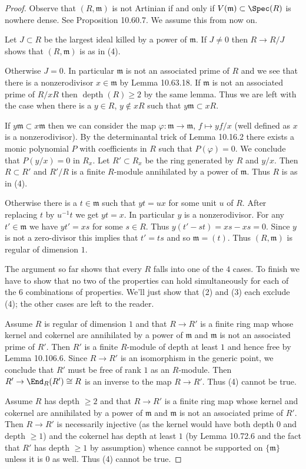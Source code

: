 \begin{proof}
Observe that $(R,\mathfrak m)$ is not Artinian if and only if $V(\mathfrak m)\subset\Spec(R)$ is nowhere dense. See Proposition 10.60.7. We assume this from now on.

Let $J\subset R$ be the largest ideal killed by a power of $\mathfrak m$. If $J\ne0$ then $R\to R/J$ shows that $(R,\mathfrak m)$ is as in (4).

Otherwise $J=0$. In particular $\mathfrak m$ is not an associated prime of $R$ and we see that there is a nonzerodivisor $x\in\mathfrak m$ by Lemma 10.63.18. If $\mathfrak m$ is not an associated prime of $R/xR$ then $\operatorname{depth}(R)\geq2$ by the same lemma. Thus we are left with the case when there is a $y\in R$, $y\notin xR$ such that $y\mathfrak m\subset xR$.

If $y\mathfrak m\subset x\mathfrak m$ then we can consider the map $\varphi:\mathfrak m\to\mathfrak m$, $f\mapsto yf/x$ (well defined as $x$ is a nonzerodivisor). By the determinantal trick of Lemma 10.16.2 there exists a monic polynomial $P$ with coefficients in $R$ such that $P(\varphi)=0$. We conclude that $P(y/x)=0$ in $R_x$. Let $R'\subset R_x$ be the ring generated by $R$ and $y/x$. Then $R\subset R'$ and $R'/R$ is a finite $R$-module annihilated by a power of $\mathfrak m$. Thus $R$ is as in (4).

Otherwise there is a $t\in\mathfrak m$ such that $yt=ux$ for some unit $u$ of $R$. After replacing $t$ by $u^{-1}t$ we get $yt=x$. In particular $y$ is a nonzerodivisor. For any $t'\in\mathfrak m$ we have $yt'=xs$ for some $s\in R$. Thus $y(t'-st)=xs-xs=0$. Since $y$ is not a zero-divisor this implies that $t'=ts$ and so $\mathfrak m=(t)$. Thus $(R,\mathfrak m)$ is regular of dimension $1$.

The argument so far shows that every $R$ falls into one of the $4$ cases. To finish we have to show that no two of the properties can hold simultaneously for each of the $6$ combinations of properties. We'll just show that (2) and (3) each exclude (4); the other cases are left to the reader.

Assume $R$ is regular of dimension $1$ and that $R\to R'$ is a finite ring map whose kernel and cokernel are annihilated by a power of $\mathfrak m$ and $\mathfrak m$ is not an associated prime of $R'$. Then $R'$ is a finite $R$-module of depth at least $1$ and hence free by Lemma 10.106.6. Since $R\to R'$ is an isomorphism in the generic point, we conclude that $R'$ must be free of rank $1$ as an $R$-module. Then $R'\to\End_R(R')\cong R$ is an inverse to the map $R\to R'$. Thus (4) cannot be true.

Assume $R$ has depth $\geq2$ and that $R\to R'$ is a finite ring map whose kernel and cokernel are annihilated by a power of $\mathfrak m$ and $\mathfrak m$ is not an associated prime of $R'$. Then $R\to R'$ is necessarily injective (as the kernel would have both depth $0$ and depth $\geq1$) and the cokernel has depth at least $1$ (by Lemma 10.72.6 and the fact that $R'$ has depth $\geq1$ by assumption) whence cannot be supported on $\{\mathfrak m\}$ unless it is $0$ as well. Thus (4) cannot be true.
\end{proof}

